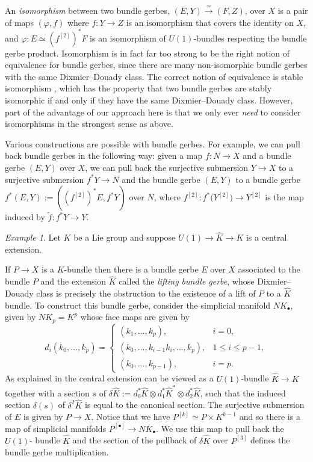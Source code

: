 \documentclass[12pt]{amsart}
\theoremstyle{plain}
\theoremstyle{definition}
\theoremstyle{remark}
\newtheorem{example}[theorem]{Example}
\numberwithin{equation}{section}
\renewcommand{\d}{\delta}
\newcommand{\<}{\langle}
\renewcommand{\>}{\rangle}
\begin{document}
An \emph{isomorphism} between two bundle gerbes, $(E, Y)\xrightarrow{\simeq} (F, Z)$,
over $X$ is a pair of maps $(\varphi,  f)$ where $f \colon Y \to Z$ is
an isomorphism that covers the identity on $X$, and $\varphi\colon E\simeq (f^{[2]})^* F$ is an isomorphism of $U(1)$-bundles respecting the bundle gerbe product.  
Isomorphism is in fact far too strong to be the right notion of equivalence for bundle gerbes, since there are many non-isomorphic bundle gerbes with the same Dixmier--Douady class. The correct notion of equivalence is stable isomorphism \cite{MurSte}, which has the property that two bundle gerbes are stably isomorphic if and only if they have the same Dixmier--Douady class. However, part of the advantage of our approach here is that we only ever \emph{need} to consider isomorphisms in the strongest sense as above.


Various constructions are possible with bundle gerbes. For example, we can pull back bundle gerbes in the following way: given a map $f \colon N \to X$ and a bundle gerbe $(E, Y)$ over $X$, we can
pull back the surjective submersion $Y\to X$ to a surjective submersion
$f^*Y \to N$ and the bundle gerbe $(E,Y)$ to a bundle gerbe $f^*(E,
Y) := \left( \left(f^{[2]}\right)^* E, f^*Y \right)$ over $N$, where
$f^{[2]} \colon f^*\big(Y^{[2]} \big) \to Y^{[2]}$ is the map induced by $\tilde{f} \colon f^*Y \to Y$. 

\begin{example}\label{ex:lifting}
Let $K$ be a Lie group and suppose $ U(1) \to \widehat{K} \to K$ is a central extension. 

If $P \to X$ is a $K$-bundle then there is a bundle gerbe $E$ over $X$ associated to the bundle $P$ and the extension $\widehat{K}$ called the \emph{lifting bundle gerbe}, whose Dixmier--Douady class is precisely the obstruction to the existence of a lift of $P$ to a $\widehat{K}$ bundle.
To construct this bundle gerbe, consider the simplicial manifold $NK_\bullet$, given by $NK_p = K^p$ whose face maps are given by 
\[
d_i(k_0, \ldots, k_p) = \begin{cases}
(k_1, \ldots, k_p), 				& i = 0,\\
(k_0, \ldots, k_{i-1} k_{i}, \ldots, k_p),	& 1 \leq i \leq p-1,\\
(k_0, \ldots, k_{p-1}),				&i = p.
\end{cases}
\]
As explained in \cite{BM} the central extension can be viewed as a $U(1)$-bundle $\widehat{K} \to K$ together with a section $s$ of $\delta \widehat{K} := d_0^*\widehat{K} \otimes d_1^* \widehat{K}^* \otimes d_2^* \widehat{K}$, such that the induced section $\d (s)$ of $\delta^2 \widehat{K}$ is equal to the canonical section. The surjective submersion of $E$ is given by $P \to X$. Notice that we have $P^{[k]} \simeq P \times K^{k-1}$ and so there is a map of simplicial manifolds $P^{[\bullet]} \to NK_\bullet$. We use this map to pull back the $U(1)$- bundle $\widehat{K}$ and the section of the pullback of $\d \widehat{K}$ over $P^{[3]}$ defines the bundle gerbe multiplication.

\end{example}
\end{document}
